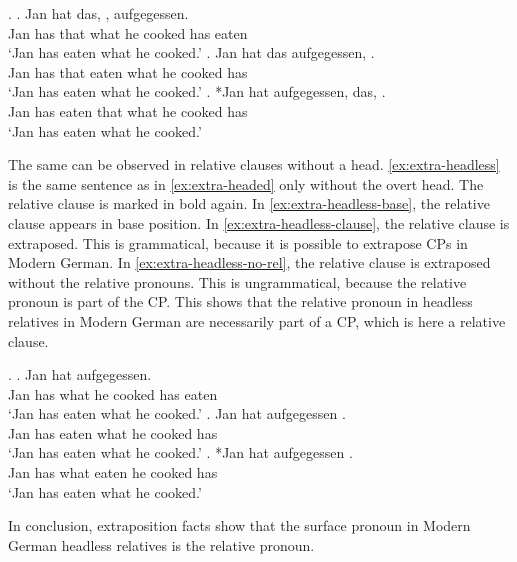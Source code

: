 \ex.\label{ex:extra-headed}
\ag. Jan hat das,    , aufgegessen.\\
Jan has that what he cooked has eaten\\
`Jan has eaten what he cooked.'\label{ex:extra-headed-base}
\bg. Jan hat das aufgegessen,    .\\
Jan has that eaten what he cooked has\\
`Jan has eaten what he cooked.'\label{ex:extra-headed-only-clause}
\cg. *Jan hat aufgegessen, das,    .\\
Jan has eaten that what he cooked has\\
`Jan has eaten what he cooked.'\label{ex:extra-headed-head-clause} 

The same can be observed in relative clauses without a head. \ref{ex:extra-headless} is the same sentence as in \ref{ex:extra-headed} only without the overt head. The relative clause is marked in bold again.
In \ref{ex:extra-headless-base}, the relative clause appears in base position. In \ref{ex:extra-headless-clause}, the relative clause is extraposed. This is grammatical, because it is possible to extrapose CPs in Modern German. In \ref{ex:extra-headless-no-rel}, the relative clause is extraposed without the relative pronouns. This is ungrammatical, because the relative pronoun is part of the CP.
This shows that the relative pronoun in headless relatives in Modern German are necessarily part of a CP, which is here a relative clause.

\ex.\label{ex:extra-headless}
\ag. Jan hat     aufgegessen.\\
Jan has what he cooked has eaten\\
`Jan has eaten what he cooked.'\label{ex:extra-headless-base}
\bg. Jan hat aufgegessen    .\\
Jan has eaten what he cooked has\\
`Jan has eaten what he cooked.'\label{ex:extra-headless-clause}
\bg. *Jan hat  aufgegessen   .\\
Jan has what eaten he cooked has\\
`Jan has eaten what he cooked.'\label{ex:extra-headless-no-rel}

In conclusion, extraposition facts show that the surface pronoun in Modern German headless relatives is the relative pronoun.

